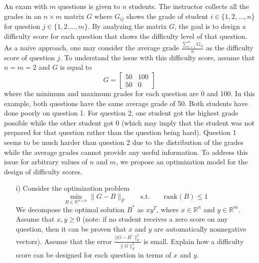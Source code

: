 \begin{homeworkProblem}

    An exam with $m$ questions is given to $n$ students. The instructor 
    collects all the grades in an $n\times m$ matrix $G$ where $G_{ij}$ 
    shows the grade of student $i\in\{1,2,...,n\}$ for question 
    $j\in\{1,2....,m\}$. By analyzing the matrix $G$, the goal is to 
    design a difficulty score for each question that shows the difficulty 
    level of that question. As a naive approach, one may consider the 
    average grade $\frac{\sum_{i=1}^n G_{ij}}{n}$ as the difficulty score 
    of question $j$. To understand the issue with this difficulty score, 
    assume that $n=m=2$ and $G$ is equal to
    \begin{equation}
        G=\left[\begin{array}{cc} 50& 100 \\ 50 & 0 \end{array}\right]
    \end{equation}
    where the minimum and maximum grades for each question are 0 and 100. 
    In this example, both questions have the same average grade of 50. Both 
    students have done poorly on question 1. For question 2, one student 
    got the highest grade possible while the other student got 0 (which may 
    imply that the student was not prepared for that question rather than 
    the question being hard). Question 1 seems to be much harder than 
    question 2 due to the distribution of the grades while the average 
    grades cannot provide any useful information. To address this issue for 
    arbitrary values of $n$ and $m$, we propose an optimization model for 
    the design of difficulty scores.
    \begin{itemize}
        \item [i)] Consider the optimization problem
        \begin{equation}
            \min_{B\in\mathbb R^{n\times m}} \|G-B\|_F\qquad\text{s.t.}\qquad 
            \text{rank}(B)\leq 1
        \end{equation}
        We decompose the optimal solution $B^*$ as $xy^T$, where 
        $x \in \mathbb R^n$ and $y \in \mathbb R^m$. Assume that $x,y\geq 0$ 
        (note: if no student receives a zero score on any question, then it can 
        be proven that $x$ and $y$ are automatically nonnegative vectors). 
        Assume that the error $\frac{||G-B^*\|_F^2}{\|G\|_F^2}$ is small. 
        Explain how a difficulty score can be designed for each question in 
        terms of $x$ and $y$.


\end{itemize}
\end{homeworkProblem}
